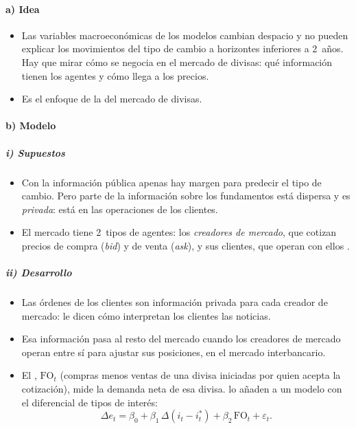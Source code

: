 \documentclass[11pt]{article}
\begin{document}
\paragraph{a) Idea}
\begin{itemize}
\item Las variables macroeconómicas de los modelos cambian despacio y no pueden explicar los movimientos del tipo de cambio a horizontes inferiores a 2~años. Hay que mirar cómo se negocia en el mercado de divisas: qué información tienen los agentes y cómo llega a los precios.
\item Es el enfoque de la  del mercado de divisas\nocite{EvansLyons2002}.
\end{itemize}

\paragraph{b) Modelo}
\subparagraph{i) Supuestos}
\begin{itemize}
\item Con la información pública apenas hay margen para predecir el tipo de cambio. Pero parte de la información sobre los fundamentos está dispersa y es \emph{privada}: está en las operaciones de los clientes.
\item El mercado tiene 2~tipos de agentes: los \emph{creadores de mercado}, que cotizan precios de compra (\emph{bid}) y de venta (\emph{ask}), y sus clientes, que operan con ellos .
\end{itemize}

\subparagraph{ii) Desarrollo}
\begin{itemize}
\item Las órdenes de los clientes son información privada para cada creador de mercado: le dicen cómo interpretan los clientes las noticias.
\item Esa información pasa al resto del mercado cuando los creadores de mercado operan entre sí para ajustar sus posiciones, en el mercado interbancario.
\item El , $\mathrm{FO}_t$ (compras menos ventas de una divisa iniciadas por quien acepta la cotización), mide la demanda neta de esa divisa. \textcite{EvansLyons2002} lo añaden a un modelo con el diferencial de tipos de interés:
  \begin{equation}\label{eq:evans-lyons}
  \Delta e_t=\beta_0+\beta_1\,\Delta(i_t-i^{*}_t)+\beta_2\,\mathrm{FO}_t+\varepsilon_t .
  \end{equation}
\end{itemize}
\end{document}
